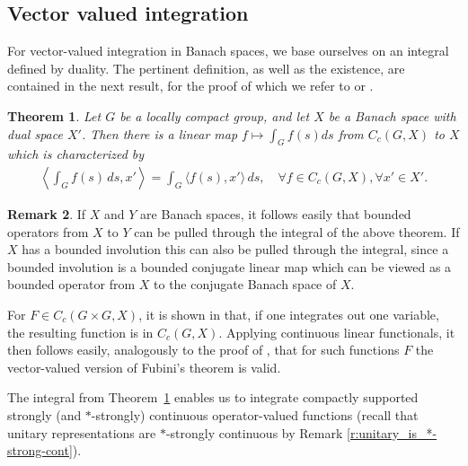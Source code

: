 \documentclass{amsart}
\theoremstyle{plain}
\newtheorem{theorem}{Theorem}[section]
\theoremstyle{definition}
\newtheorem{remark}[theorem]{Remark}
\numberwithin{equation}{section}
\begin{document}
\subsection{Vector valued integration}\label{subsec:vector_valued_integration}

For vector-valued integration in Banach spaces, we base ourselves on an integral defined by duality. The pertinent definition, as well as the existence, are contained in the next result, for the proof of which we refer to \cite[Theorem~3.27]{rudin} or \cite[Lemma~1.91]{williams}.

\begin{theorem}\label{t:vector_valued_integration}
 Let $G$ be a locally compact group, and let $X$ be a Banach space with dual space $X'$. Then there is a linear map $f \mapsto \int_G f(s) ds$ from $C_c(G,X)$ to $X$ which is characterized by
\begin{align}\label{d:characterization_of_integral}
\left\langle \int_G f(s) {\,ds}, x' \right\rangle = \int_G \langle f(s), x' \rangle {\,ds}, \quad \forall f \in C_c(G,X), \forall x' \in X'.
\end{align}
\end{theorem}

\begin{remark}\label{r:vector_valued_integration}
If $X$ and $Y$ are Banach spaces, it follows easily that bounded operators from $X$ to $Y$ can be pulled through the integral of the above theorem. If $X$ has a bounded involution this can also be pulled through the integral, since a bounded involution is a bounded conjugate linear map which can be viewed as a bounded operator from $X$ to the conjugate Banach space of $X$.

For $F \in C_c(G \times G, X)$, it is shown in \cite[Proposition~1.102]{williams} that, if one integrates out one variable, the resulting function is in $C_c(G,X)$. Applying continuous linear functionals, it then follows easily, analogously to the proof of \cite[Proposition~1.105]{williams}, that for such functions $F$ the vector-valued version of Fubini's theorem is valid.
\end{remark}

The integral from Theorem~\ref{t:vector_valued_integration} enables us to integrate compactly supported strongly (and $*$-strongly) continuous operator-valued functions (recall that unitary representations are $*$-strongly continuous by Remark \ref{r:unitary_is_*-strong-cont}).
\end{document}
